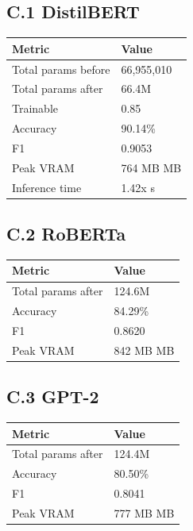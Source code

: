 \subsection{C.1 DistilBERT}

\begin{table}[H]
\centering
\small
\begin{tabular}{ll}
\toprule
\textbf{Metric} & \textbf{Value} \\
\midrule
Total params before & 66,955,010 \\
Total params after & 66.4M \\
Trainable & 0.85 \\
Accuracy & 90.14\% \\
F1 & 0.9053 \\
Peak VRAM & 764 MB MB \\
Inference time & 1.42x s \\
\bottomrule
\end{tabular}
\end{table}

\subsection{C.2 RoBERTa}

\begin{table}[H]
\centering
\small
\begin{tabular}{ll}
\toprule
\textbf{Metric} & \textbf{Value} \\
\midrule
Total params after & 124.6M \\
Accuracy & 84.29\% \\
F1 & 0.8620 \\
Peak VRAM & 842 MB MB \\
\bottomrule
\end{tabular}
\end{table}

\subsection{C.3 GPT-2}

\begin{table}[H]
\centering
\small
\begin{tabular}{ll}
\toprule
\textbf{Metric} & \textbf{Value} \\
\midrule
Total params after & 124.4M \\
Accuracy & 80.50\% \\
F1 & 0.8041 \\
Peak VRAM & 777 MB MB \\
\bottomrule
\end{tabular}
\end{table}

